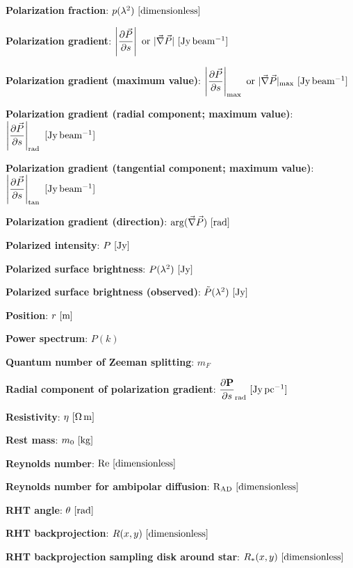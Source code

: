 \documentclass[a4paper,10pt]{article}
\begin{document}
{\noindent}\textbf{Polarization fraction}: $p(\lambda^2)~[{\rm dimensionless}]$

{\noindent}\textbf{Polarization gradient}: $\left\lvert\dfrac{\partial\vec{P}}{\partial s}\right\rvert~{\rm or}~\lvert\vec\nabla\vec{P}\rvert ~ [\rm Jy\,beam^{-1}]$

{\noindent}\textbf{Polarization gradient (maximum value)}: $\left\lvert\dfrac{\partial\vec{P}}{\partial s}\right\rvert_{\rm max}~{\rm or}~\lvert\vec\nabla\vec{P}\rvert_{\rm max} ~ [\rm Jy\,beam^{-1}]$

{\noindent}\textbf{Polarization gradient (radial component; maximum value)}: $\left\lvert\dfrac{\partial\vec{P}}{\partial s}\right\rvert_\mathrm{rad}~ [\rm Jy\,beam^{-1}]$

{\noindent}\textbf{Polarization gradient (tangential component; maximum value)}: $\left\lvert\dfrac{\partial\vec{P}}{\partial s}\right\rvert_\mathrm{tan}~ [\rm Jy\,beam^{-1}]$

{\noindent}\textbf{Polarization gradient (direction)}: $\mathrm{arg}(\vec\nabla\vec{P}) ~ [\rm rad]$

{\noindent}\textbf{Polarized intensity}: $P ~ [\rm Jy]$

{\noindent}\textbf{Polarized surface brightness}: $P(\lambda^2) ~ [\rm Jy]$

{\noindent}\textbf{Polarized surface brightness (observed)}: $\tilde{P}(\lambda^2) ~ [\rm Jy]$

{\noindent}\textbf{Position}: $r~[{\rm m}]$

{\noindent}\textbf{Power spectrum}: $P(k)$

{\noindent}\textbf{Quantum number of Zeeman splitting}: $m_F$

{\noindent}\textbf{Radial component of polarization gradient}: $\dfrac{\partial\mathbf{P}}{\partial s}_\mathrm{rad} ~ [{\rm Jy\,pc^{-1}}]$

{\noindent}\textbf{Resistivity}: $\eta~[{\rm \Omega\,m}]$

{\noindent}\textbf{Rest mass}: $m_0~[{\rm kg}]$

{\noindent}\textbf{Reynolds number}: ${\rm Re}~[{\rm dimensionless}]$

{\noindent}\textbf{Reynolds number for ambipolar diffusion}: ${\rm R}_\mathrm{\rm AD}~[{\rm dimensionless}]$

{\noindent}\textbf{RHT angle}: $\theta~[{\rm rad}]$

{\noindent}\textbf{RHT backprojection}: $R(x,y) ~ [{\rm dimensionless}]$

{\noindent}\textbf{RHT backprojection sampling disk around star}: $R_*(x,y) ~ [{\rm dimensionless}]$
\end{document}
